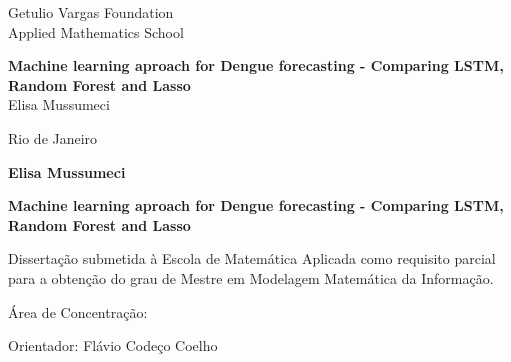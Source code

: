 \documentclass[12pt]{report}
\begin{document}
\begin{titlepage}
\begin{center}
{\LARGE Getulio Vargas Foundation}\\
\vspace{0.3cm}
{\LARGE Applied Mathematics School}\\
\vspace{0.3cm}

\par
\vspace{170pt}
  \textbf{\Large {Machine learning aproach for Dengue forecasting - Comparing LSTM, Random Forest and Lasso}}\\
  
\vspace{32pt}
{\Large Elisa Mussumeci}\\
\end{center}

\par
\vfill
\begin{center}
{{\normalsize Rio de Janeiro}\\
{\normalsize \the\year}}
\end{center}
\end{titlepage}

\thispagestyle{empty}

\newpage
\begin{center}
\textbf{\LARGE Elisa Mussumeci}

\par
\vspace{200pt}
\textbf{\Large Machine learning aproach for Dengue forecasting - Comparing LSTM, Random Forest and Lasso}
\end{center}

\par
\vspace{85pt}
\hspace*{175pt}\parbox{7.6cm}{{\normalsize Dissertação submetida à Escola de Matemática Aplicada como requisito parcial para a obtenção do grau de Mestre em Modelagem Matemática da Informação.}}

\par
\vspace{1em}
\hspace*{125pt}\parbox{10.0cm}{{\normalsize Área de Concentração: }}

\par
\vspace{1em}
\hspace*{125pt}\parbox{10.0cm}{{\normalsize Orientador: Flávio Codeço Coelho}}\\
\end{document}
